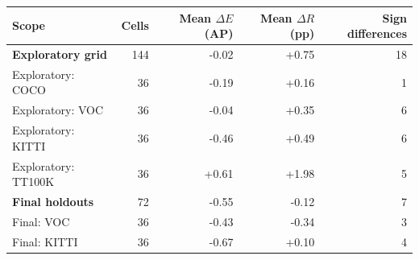 \begin{tabular}{lrrrr}
\toprule
Scope & Cells & Mean $\Delta E$ (AP) & Mean $\Delta R$ (pp) & Sign differences \\
\midrule
\textbf{Exploratory grid} & 144 & -0.02 & +0.75 & 18 \\
Exploratory: COCO & 36 & -0.19 & +0.16 & 1 \\
Exploratory: VOC & 36 & -0.04 & +0.35 & 6 \\
Exploratory: KITTI & 36 & -0.46 & +0.49 & 6 \\
Exploratory: TT100K & 36 & +0.61 & +1.98 & 5 \\
\midrule
\textbf{Final holdouts} & 72 & -0.55 & -0.12 & 7 \\
Final: VOC & 36 & -0.43 & -0.34 & 3 \\
Final: KITTI & 36 & -0.67 & +0.10 & 4 \\
\bottomrule
\end{tabular}
